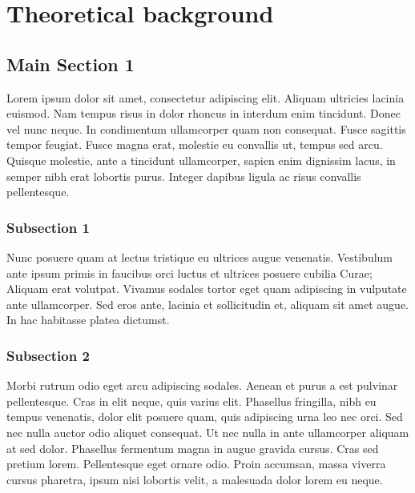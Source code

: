 
\chapter{Theoretical background} %

\label{Chapter2} %


\section{Main Section 1}

Lorem ipsum dolor sit amet, consectetur adipiscing elit. Aliquam ultricies lacinia
euismod. Nam tempus risus in dolor rhoncus in interdum enim tincidunt. Donec vel nunc
neque. In condimentum ullamcorper quam non consequat. Fusce sagittis tempor feugiat. Fusce
magna erat, molestie eu convallis ut, tempus sed arcu. Quisque molestie, ante a tincidunt
ullamcorper, sapien enim dignissim lacus, in semper nibh erat lobortis purus. Integer
dapibus ligula ac risus convallis pellentesque.

\subsection{Subsection 1}

Nunc posuere quam at lectus tristique eu ultrices augue venenatis. Vestibulum ante ipsum
primis in faucibus orci luctus et ultrices posuere cubilia Curae; Aliquam erat volutpat.
Vivamus sodales tortor eget quam adipiscing in vulputate ante ullamcorper. Sed eros ante,
lacinia et sollicitudin et, aliquam sit amet augue. In hac habitasse platea dictumst.


\subsection{Subsection 2}
Morbi rutrum odio eget arcu adipiscing sodales. Aenean et purus a est pulvinar
pellentesque. Cras in elit neque, quis varius elit. Phasellus fringilla, nibh eu tempus
venenatis, dolor elit posuere quam, quis adipiscing urna leo nec orci. Sed nec nulla
auctor odio aliquet consequat. Ut nec nulla in ante ullamcorper aliquam at sed dolor.
Phasellus fermentum magna in augue gravida cursus. Cras sed pretium lorem. Pellentesque
eget ornare odio. Proin accumsan, massa viverra cursus pharetra, ipsum nisi lobortis
velit, a malesuada dolor lorem eu neque.


